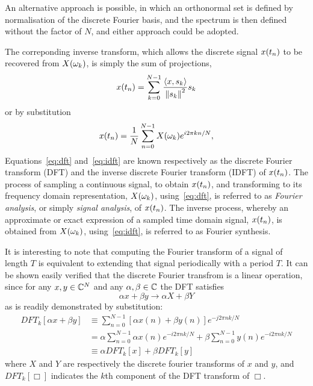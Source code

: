 An alternative approach is possible, in which an orthonormal set is defined by normalisation of the discrete Fourier basis, and the spectrum is then defined without the factor of $N$, and either approach could be adopted.

The correponding inverse transform, which allows the discrete signal $x(t_n)$ to be recovered from $X(\omega_{k})$, is simply the sum of projections,
$$
x(t_n) = \sum_{k=0}^{N-1}\frac { \left< x, s_k \right> }{\left\lVert s_k\right\rVert^2} s_k
$$
or by substitution
\begin{equation}
  x(t_n) = \frac{1}{N} \sum_{n=0}^{N-1} X(\omega_{k}) e^{i 2 \pi k n / N }
  \label{eq:idft} ,
\end{equation}
Equations~\eqref{eq:dft} and~\eqref{eq:idft} are known respectively as the discrete Fourier transform (DFT) and the inverse discrete Fourier transform (IDFT) of $x(t_n)$. The process of sampling a continuous signal, to obtain $x(t_n)$, and transforming to its frequency domain representation, $X(\omega_{k})$, using~\eqref{eq:dft}, is referred to as \textit{Fourier analysis}, or simply \textit{signal analysis}, of $x(t_n)$. The inverse process, whereby an approximate or exact expression of a sampled time domain signal, $x(t_n)$, is obtained from $X(\omega_k)$, using~\eqref{eq:idft}, is referred to as Fourier synthesis.

It is interesting to note that computing the Fourier transform of a signal of length $T$ is equivalent to extending that signal periodically with a period $T$. It can be shown easily verified that the discrete Fourier transfrom is a linear operation, since for any $x,y \in \mathbb{C}^{N}$ and any $\alpha,\beta \in \mathbb{C}$ the DFT satisfies
$$
\alpha x + \beta y \to \alpha X + \beta Y
$$
as is readily demonstrated by substitution:
\begin{align*}
  DFT_k [ \alpha x + \beta y]
  &\equiv \sum_{n=0}^{N-1} \left[ \alpha x(n) + \beta y(n) \right] e^{-j 2 \pi n k / N} \\
  &= \alpha \sum_{n=0}^{N-1} \alpha x(n) e ^ {-i 2 \pi n k /N} + \beta \sum_{n=0}^{N-1} y(n) e^{-i 2 \pi n k / N} \\
  &\equiv \alpha DFT_k[ x ] + \beta DFT_k[ y ]
\end{align*}
where $X$ and $Y$ are respectively the discrete fourier transforms of $x$ and $y$, and $DFT_k[\Box]$ indicates the $k$th component of the DFT transform of $\Box$.

